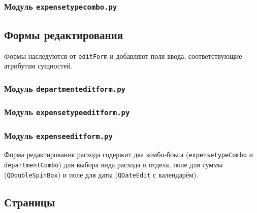 \documentclass[14pt,a4paper]{extreport}
\begin{document}
\subsubsection{Модуль \texttt{expensetypecombo.py}}



\subsection{Формы редактирования}

Формы наследуются от \texttt{editForm} и добавляют поля ввода, соответствующие атрибутам сущностей.

\subsubsection{Модуль \texttt{departmenteditform.py}}



\subsubsection{Модуль \texttt{expensetypeeditform.py}}



\subsubsection{Модуль \texttt{expenseeditform.py}}

Форма редактирования расхода содержит два комбо-бокса (\texttt{expensetypeCombo} и \texttt{departmentCombo}) для выбора вида расхода и отдела, поле для суммы (\texttt{QDoubleSpinBox}) и поле для даты (\texttt{QDateEdit} с календарём).



\subsection{Страницы}
\end{document}
